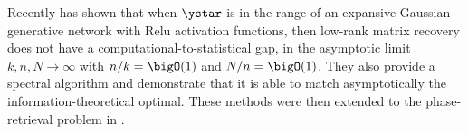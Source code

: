 Recently \cite{aubin2019spiked} has shown that when $\ystar$ is in the range of an expansive-Gaussian generative network with Relu activation functions,
then low-rank matrix recovery does not have a computational-to-statistical gap,
in the asymptotic limit $k,n,N \to \infty$ with $n/k = \bigO(1)$ 
and  $N/n = \bigO(1)$. They also provide a spectral algorithm and demonstrate that it is able to match asymptotically the information-theoretical optimal. These methods were then extended to the phase-retrieval problem in \cite{aubin2019exact}.

